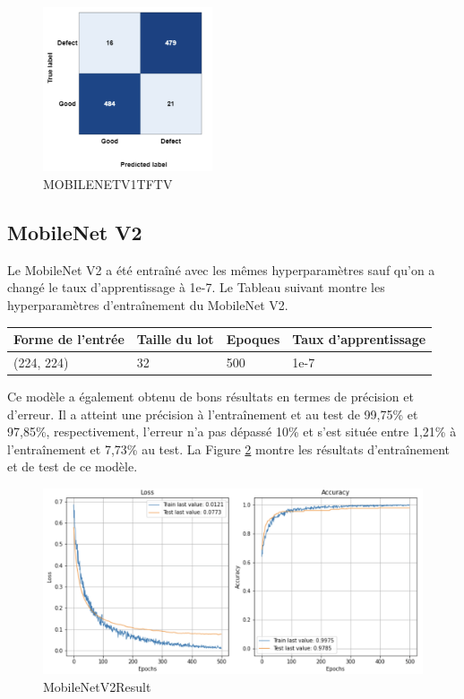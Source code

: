 \begin{figure}[h]
    \centering
    \includegraphics[width=5cm]{assets/PartTwo/ChapterTwo/MOBILENETV1TFTV.png}
    \caption{MOBILENETV1TFTV}
    \label{MOBILENETV1TFTV}
    \end{figure}
\newpage
\subsection{MobileNet V2}
Le MobileNet V2 a été entraîné avec les mêmes hyperparamètres sauf qu’on a changé le taux d’apprentissage à 1e-7. Le Tableau suivant montre les hyperparamètres d'entraînement du MobileNet V2. 
\begin{table}[h]
    \begin{center}
        \begin{tabular}{|l|l|l|l|}
            \hline
            Forme de l'entrée & Taille du lot & Epoques & Taux d'apprentissage \\ \hline
            (224, 224)        & 32            & 500     & 1e-7                 \\ \hline
            \end{tabular}
    \end{center}
    
    \end{table}
    Ce modèle a également obtenu de bons résultats en termes de précision et d'erreur. Il a atteint une précision à l'entraînement et au test de 99,75\% et 97,85\%, respectivement, l'erreur n'a pas dépassé 10\% et s'est située entre 1,21\% à l'entraînement et 7,73\% au test. La Figure \ref{MobileNetV2Result} montre les résultats d'entraînement et de test de ce modèle. 
    \begin{figure}[h]
        \centering
        \includegraphics[width=13cm]{assets/PartTwo/ChapterTwo/MobileNetV2Result.png}
        \caption{MobileNetV2Result}
        \label{MobileNetV2Result}
        \end{figure}

